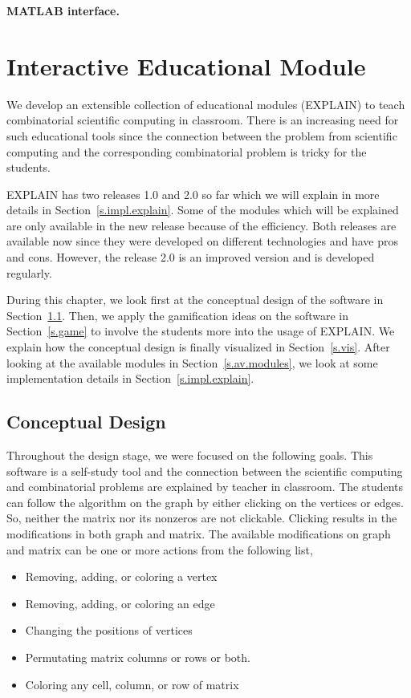 \documentclass[11pt, twoside,a4paper]{book}
\newcommand{\secref}[1]{Section~\protect\ref{#1}}
\begin{document}
\textbf{MATLAB interface.}
\chapter{Interactive Educational Module}
\label{explain}
We develop an extensible collection of educational modules (\mbox{EXPLAIN})
to teach combinatorial scientific computing in classroom.
There is an increasing need for such educational tools since the connection
between the problem from scientific computing and the corresponding combinatorial
problem is tricky for the students.

\mbox{EXPLAIN} has two releases 1.0 and 2.0 so far which we will explain in more 
details in \secref{s.impl.explain}. Some of the modules which will be explained
are only available in the new release because of the efficiency. Both releases
are available now since they were developed on different technologies and have
pros and cons. However, the release 2.0 is an improved version and is developed
regularly.

During this chapter, we look first at the conceptual design of the software in
\secref{s.concept}. Then, we apply the gamification ideas on the software in
\secref{s.game} to involve the students more into the usage of \mbox{EXPLAIN}.
We explain how the conceptual design is finally visualized in \secref{s.vis}.
After looking at the available modules in \secref{s.av.modules}, we look at 
some implementation details in \secref{s.impl.explain}.
\section{Conceptual Design}
\label{s.concept}
Throughout the design stage, we were focused on the following goals.
This software is a self-study tool and the connection between the scientific computing
and combinatorial problems are explained by teacher in classroom.
The students can follow the algorithm on the graph by either
clicking on the vertices or edges.
So, neither the matrix nor its nonzeros are not clickable.
Clicking results in the modifications in both graph and matrix.
The available modifications on graph and matrix can be one or more actions
from the following list,
\begin{itemize}
\item Removing, adding, or coloring a vertex
\item Removing, adding, or coloring an edge
\item Changing the positions of vertices
\item Permutating matrix columns or rows or both.
\item Coloring any cell, column, or row of matrix
\end{itemize}
\end{document}
